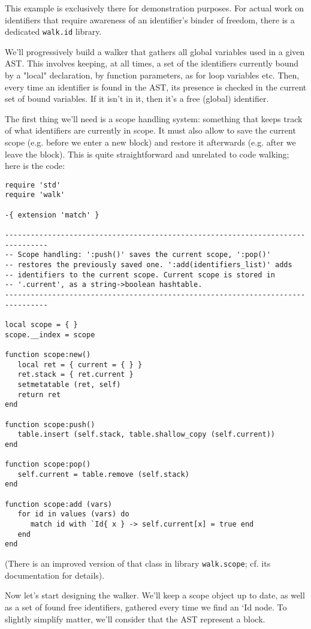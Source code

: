 This example is exclusively there for demonstration purposes. For actual work on
identifiers that require awareness of an identifier's binder of freedom, there
is a dedicated {\tt walk.id} library.

We'll progressively build a walker that gathers all global variables used in a
given AST. This involves keeping, at all times, a set of the identifiers
currently bound by a "local" declaration, by function parameters, as for loop
variables etc. Then, every time an identifier is found in the AST, its presence
is checked in the current set of bound variables. If it isn't in it, then it's a
free (global) identifier.

The first thing we'll need is a scope handling system: something that keeps
track of what identifiers are currently in scope. It must also allow to save the
current scope (e.g. before we enter a new block) and restore it afterwards (e.g.
after we leave the block). This is quite straightforward and unrelated to code
walking; here is the code:

\begin{verbatim}
require 'std'
require 'walk'

-{ extension 'match' }

--------------------------------------------------------------------------------
-- Scope handling: ':push()' saves the current scope, ':pop()'
-- restores the previously saved one. ':add(identifiers_list)' adds
-- identifiers to the current scope. Current scope is stored in
-- '.current', as a string->boolean hashtable.
--------------------------------------------------------------------------------

local scope = { }
scope.__index = scope

function scope:new()
   local ret = { current = { } }
   ret.stack = { ret.current }
   setmetatable (ret, self)
   return ret
end

function scope:push()
   table.insert (self.stack, table.shallow_copy (self.current))
end

function scope:pop()
   self.current = table.remove (self.stack)
end

function scope:add (vars)
   for id in values (vars) do
      match id with `Id{ x } -> self.current[x] = true end
   end
end
\end{verbatim}

(There is an improved version of that class in library {\tt walk.scope}; cf.
its documentation for details).

Now let's start designing the walker. We'll keep a scope object up to date, as
well as a set of found free identifiers, gathered every time we find an `Id{ }
node. To slightly simplify matter, we'll consider that the AST represent a
block.

